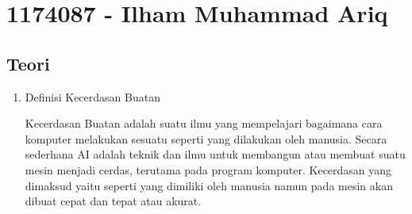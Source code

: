 \section{1174087 - Ilham Muhammad Ariq}
\subsection{Teori}
\begin{enumerate}
	\item Definisi Kecerdasan Buatan
	\par Kecerdasan Buatan adalah suatu ilmu yang mempelajari bagaimana cara komputer melakukan sesuatu seperti yang dilakukan oleh manusia. Secara sederhana AI adalah teknik dan ilmu untuk membangun atau membuat suatu mesin menjadi cerdas, terutama pada program komputer. Kecerdasan yang dimaksud yaitu seperti yang dimiliki oleh manusia namun pada mesin akan dibuat cepat dan tepat atau akurat.


\end{enumerate}
